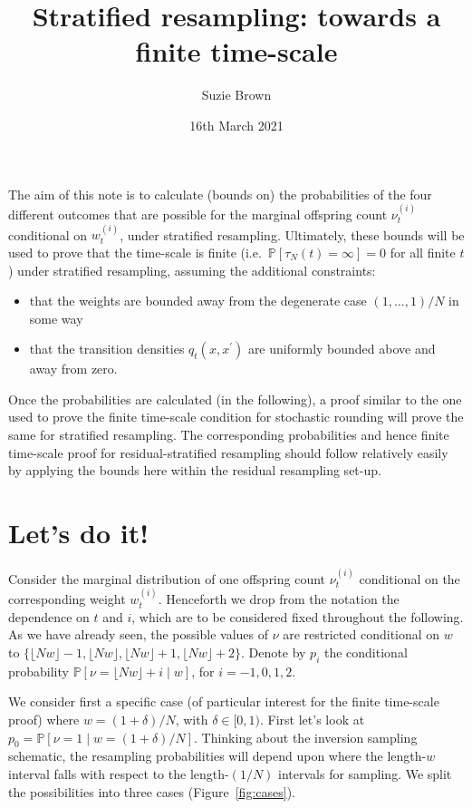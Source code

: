 \documentclass[fleqn]{article}
\title{Stratified resampling: towards a finite time-scale}
\author{Suzie Brown}
\date{16th March 2021}
\newcommand{\Prob}{\mathbb{P}}
\newcommand{\flnw}{\lfloor N w \rfloor}
\begin{document}
\maketitle
\thispagestyle{fancy}

The aim of this note is to calculate (bounds on) the probabilities of the four different outcomes that are possible for the marginal offspring count $\nu_t^{(i)}$ conditional on $w_t^{(i)}$, under stratified resampling.
Ultimately, these bounds will be used to prove that the time-scale is finite
(i.e.\ $\Prob[\tau_N(t)=\infty]=0$ for all finite $t$)
under stratified resampling, assuming the additional constraints:
\begin{itemize}
\item that the weights are bounded away from the degenerate case $(1,\dots,1)/N$ in some way
\item that the transition densities $q_t(x,x^\prime)$ are uniformly bounded above and away from zero.
\end{itemize}
Once the probabilities are calculated (in the following), a proof similar to the one used to prove the finite time-scale condition for stochastic rounding will prove the same for stratified resampling.
The corresponding probabilities and hence finite time-scale proof for residual-stratified resampling should follow relatively easily by applying the bounds here within the residual resampling set-up.


\section*{Let's do it!}
Consider the marginal distribution of one offspring count $\nu_t^{(i)}$ conditional on the corresponding weight $w_t^{(i)}$. Henceforth we drop from the notation the dependence on $t$ and $i$, which are to be considered fixed throughout the following.
As we have already seen, the possible values of $\nu$ are restricted conditional on $w$ to $\{ \flnw-1, \flnw, \flnw+1, \flnw+2 \}$. Denote by $p_i$ the conditional probability $\Prob[ \nu = \flnw + i \mid w ]$, for $i = -1,0,1,2$.

We consider first a specific case (of particular interest for the finite time-scale proof) where $w= (1+\delta)/N$, with $\delta \in [0,1)$.
First let's look at $p_0 = \Prob[ \nu = 1 \mid w = (1+\delta)/N ]$.
Thinking about the inversion sampling schematic, %
the resampling probabilities will depend upon where the length-$w$ interval falls with respect to the length-$(1/N)$ intervals for sampling. We split the possibilities into three cases (Figure~\ref{fig:cases}).
\end{document}
